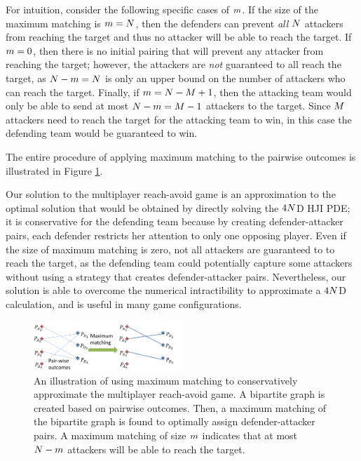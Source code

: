 For intuition, consider the following specific cases of $m$. If the size of the maximum matching is $m=N$, then the defenders can prevent \textit{all} $N$ attackers from reaching the target and thus no attacker will be able to reach the target. If $m=0$, then there is no initial pairing that will prevent any attacker from reaching the target; however, the attackers are \textit{not} guaranteed to all reach the target, as $N-m=N$ is only an upper bound on the number of attackers who can reach the target. Finally, if $m=N-M+1$, then the attacking team would only be able to send at most $N-m=M-1$ attackers to the target. Since $M$ attackers need to reach the target for the attacking team to win, in this case the defending team would be guaranteed to win. 

The entire procedure of applying maximum matching to the pairwise outcomes is illustrated in Figure \ref{fig:general_procedure}.

Our solution to the multiplayer reach-avoid game is an approximation to the optimal solution that would be obtained by directly solving the $4N$D HJI PDE; it is conservative for the defending team because by creating defender-attacker pairs, each defender restricts her attention to only one opposing player. Even if the size of maximum matching is zero, not all attackers are guaranteed to to reach the target, as the defending team could potentially capture some attackers without using a strategy that creates defender-attacker pairs. Nevertheless, our solution is able to overcome the numerical intractibility to approximate a $4N$D calculation, and is useful in many game configurations.

\begin{figure}
\centering
\includegraphics[width=0.5\textwidth]{"fig/general procedure"}
\caption{An illustration of using maximum matching to conservatively approximate the multiplayer reach-avoid game. A bipartite graph is created based on pairwise outcomes. Then, a maximum matching of the bipartite graph is found to optimally assign defender-attacker pairs. A maximum matching of size $m$ indicates that at most $N-m$ attackers will be able to reach the target.}
\label{fig:general_procedure}
\end{figure}

